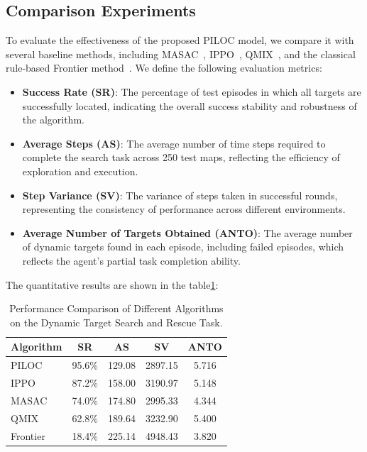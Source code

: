 \documentclass[lettersize,journal]{IEEEtran}
\begin{document}
\subsection{Comparison Experiments}
To evaluate the effectiveness of the proposed PILOC model, we compare it with several baseline methods, including MASAC~\cite{lowe2017multi}, IPPO~\cite{de2020independent}, QMIX~\cite{rashid2020monotonic}, and the classical rule-based Frontier method~\cite{yamauchi1998frontier}. We define the following evaluation metrics:
\begin{itemize}
    \item \textbf{Success Rate (SR)}: The percentage of test episodes in which all targets are successfully located, indicating the overall success stability and robustness of the algorithm.
    \item \textbf{Average Steps (AS)}: The average number of time steps required to complete the search task across 250 test maps, reflecting the efficiency of exploration and execution.
    \item \textbf{Step Variance (SV)}: The variance of steps taken in successful rounds, representing the consistency of performance across different environments.
    \item \textbf{Average Number of Targets Obtained (ANTO)}: The average number of dynamic targets found in each episode, including failed episodes, which reflects the agent’s partial task completion ability.
\end{itemize}

The quantitative results are shown in the table\ref{tab:performance_comparison}:
\begin{table}[!t]
\caption{Performance Comparison of Different Algorithms on the Dynamic Target Search and Rescue Task.}
\centering
\begin{tabular}{lcccc}
\toprule
\textbf{Algorithm} & \textbf{SR} & \textbf{AS} & \textbf{SV} & \textbf{ANTO} \\
\midrule
PILOC    & 95.6\% & 129.08 & 2897.15 & 5.716 \\
IPPO     & 87.2\% & 158.00 & 3190.97 & 5.148 \\
MASAC    & 74.0\% & 174.80 & 2995.33 & 4.344 \\
QMIX     & 62.8\% & 189.64 & 3232.90 & 5.400 \\
Frontier & 18.4\% & 225.14 & 4948.43 & 3.820 \\
\bottomrule
\end{tabular}
\label{tab:performance_comparison}
\end{table}
\end{document}
